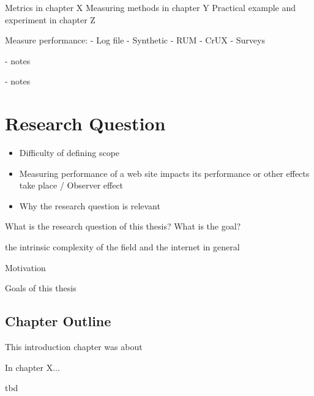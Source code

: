 
Metrics in chapter X
Measuring methods in chapter Y
Practical example and experiment in chapter Z









Measure performance:
- Log file
- Synthetic
- RUM
- CrUX
- Surveys




- notes



- notes








\section{Research Question}

\begin{itemize}
\item Difficulty of defining scope
\item Measuring performance of a web site impacts its performance or other effects take place / Observer effect
\item Why the research question is relevant
\end{itemize}

What is the research question of this thesis?
What is the goal?

the intrinsic complexity of the field and the internet in general




Motivation


Goals of this thesis


\subsection{Chapter Outline}

This introduction chapter was about

In chapter X...

tbd











